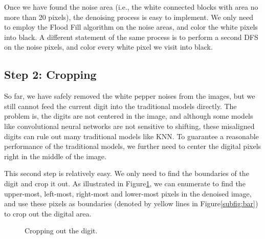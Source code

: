 \documentclass{article}
\begin{document}
Once we have found the noise area (i.e., the white connected blocks with area no more than 20 pixels), the denoising process is easy to implement. We only need to employ the Flood Fill algorithm on the noise areas, and color the white pixels into black. A different statement of the same process is to perform a second DFS on the noise pixels, and color every white pixel we visit into black. 

\subsection{Step 2: Cropping}

So far, we have safely removed the white pepper noises from the images, but we still cannot feed the current digit into the traditional models directly. The problem is, the digits are not centered in the image, and although some models like convolutional neural networks are not sensitive to shifting, these misaligned digits can rule out many traditional models like KNN. To guarantee a reasonable performance of the traditional models, we further need to center the digital pixels right in the middle of the image.

This second step is relatively easy. We only need to find the boundaries of the digit and crop it out. As illustrated in Figure\ref{fig:crop}, we can enumerate to find the upper-most, left-most, right-most and lower-most pixels in the denoised image, and use these pixels as boundaries (denoted by yellow lines in Figure\ref{subfig:bar}) to crop out the digital area.

\begin{figure}[!htb]
	\centering
	\hspace{.2in}
	\caption{Cropping out the digit.}
	\label{fig:crop}
\end{figure}
\end{document}
